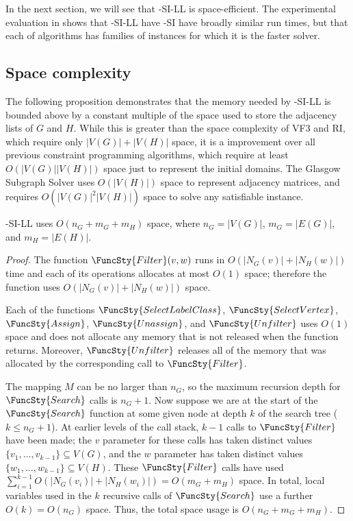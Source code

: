 In the next section, we will see that \McSplit-SI-LL is space-efficient.  The experimental evaluation
in  shows that \McSplit-SI-LL have \McSplit-SI have broadly
similar run times, but that each of algorithms has families of instances for which it is the faster
solver.

\subsection{Space complexity}\label{sec:mcsplit-si-space-complexity}

The following proposition demonstrates that the memory needed by \McSplit-SI-LL
is bounded above by a constant multiple of the space used to store the adjacency
lists of $G$ and $H$.  While this is greater than the space complexity of 
VF3 and RI, which require only $|V(G)| + |V(H)|$ space, it is a improvement
over all previous constraint programming algorithms, which
require at least $O(|V(G)| |V(H)|)$ space just to represent
the initial domains.  The Glasgow Subgraph Solver uses $O(|V(H)|)$ space
to represent adjacency matrices, and requires $O(|V(G)|^2|V(H)|)$ space
to solve any satisfiable instance.

\begin{proposition}\label{mcsplit-si-space}
    \McSplit-SI-LL uses $O(n_G + m_G + m_H)$ space, where
    $n_G=|V(G)|$,
    $m_G=|E(G)|$, and
    $m_H=|E(H)|$.
\end{proposition}

\begin{proof}
    The function $\FuncSty{Filter}(v,w)$ runs in $O(|N_G(v)| + |N_H(w)|)$ time
    and each of its operations allocates at most $O(1)$ space; therefore the
    function uses $O(|N_G(v)| + |N_H(w)|)$ space.

    Each of the functions
    $\FuncSty{SelectLabelClass}$,
    $\FuncSty{SelectVertex}$,
    $\FuncSty{Assign}$,
    $\FuncSty{Unassign}$,
    and
    $\FuncSty{Unfilter}$
    uses $O(1)$ space and does not allocate any memory that is not released
    when the function returns.  Moreover, $\FuncSty{Unfilter}$ releases
    all of the memory that was allocated by the corresponding call to $\FuncSty{Filter}$.

    The mapping $M$ can be no larger than $n_G$, so the maximum recursion depth for
    $\FuncSty{Search}$ calls is $n_G + 1$.  Now suppose we are at the start of the
    $\FuncSty{Search}$ function at some given node at depth $k$ of the search tree 
    ($k \leq n_G + 1$).  At earlier levels of the call stack, $k-1$ calls to $\FuncSty{Filter}$
    have been made; the $v$ parameter for these calls has taken distinct values
    $\{v_1, \dots, v_{k-1}\} \subseteq V(G)$, and the $w$ parameter has taken distinct values
    $\{w_1, \dots, w_{k-1}\} \subseteq V(H)$.  These $\FuncSty{Filter}$ calls have used
    $\sum_{i=1}^{k-1} O(|N_G(v_i)| + |N_H(w_i)|) = O(m_G + m_H)$ space.  In total,
    local variables used in the $k$
    recursive calls of $\FuncSty{Search}$ use a further $O(k) = O(n_G)$ space.  Thus,
    the total space usage is $O(n_G + m_G + m_H)$.
\end{proof}

